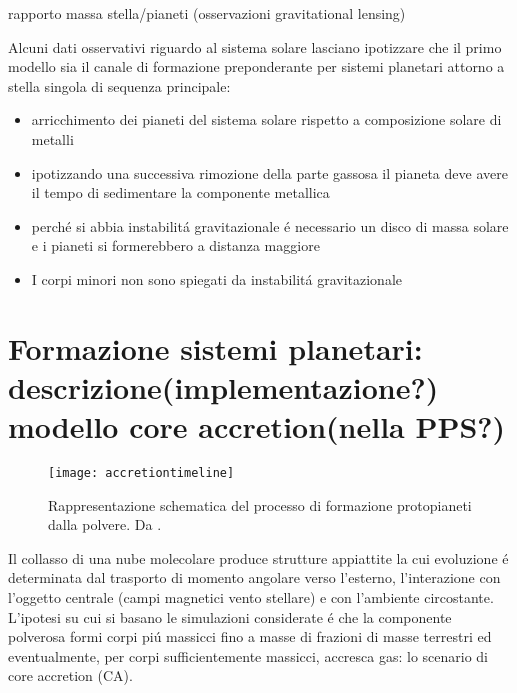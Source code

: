 \documentclass[twoside,11pt,fleqn]{memoir}%
\begin{document}
\begin{workout}
	rapporto massa stella/pianeti (osservazioni gravitational lensing)
\end{workout}

\begin{workout}
	Alcuni dati osservativi riguardo al sistema solare lasciano ipotizzare che il primo modello sia il canale di formazione preponderante per sistemi planetari attorno a stella singola di sequenza principale:
	\begin{itemize}
		\item arricchimento dei pianeti del sistema solare rispetto a composizione solare di metalli%
		\item ipotizzando una successiva rimozione della parte gassosa il pianeta deve avere il tempo di sedimentare la componente metallica
		\item perch\'e si abbia instabilit\'a gravitazionale \'e necessario un disco di massa solare e i pianeti si formerebbero a distanza maggiore
		\item I corpi minori non sono spiegati da instabilit\'a gravitazionale
	\end{itemize}
\end{workout}


\cleartorecto

{\let\clearpage\relax\let\cleardoublepage\relax
\part{Formazione sistemi planetari: descrizione(implementazione?) modello core accretion(nella PPS?)}\label{part:CAdesc}
}
\begin{figure}[!ht]
\texttt{[image: accretiontimeline]}\caption{Rappresentazione schematica del processo di formazione protopianeti dalla polvere. Da \cite{perryman2011exoplanet}.}\label{fig:accretiontimeline}
\end{figure}
\begin{errata}
Il collasso di una nube molecolare produce strutture appiattite la cui evoluzione \'e determinata dal trasporto di momento angolare verso l'esterno, l'interazione con l'oggetto centrale (campi magnetici vento stellare) e con l'ambiente circostante.
L'ipotesi su cui si basano le simulazioni considerate \'e che la componente polverosa formi corpi pi\'u massicci fino a masse di frazioni di masse terrestri  ed eventualmente, per corpi sufficientemente massicci, accresca gas: lo scenario di core accretion (CA).
\end{errata}
\end{document}
